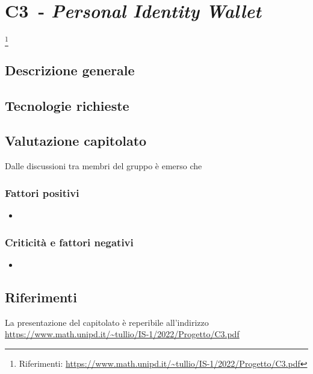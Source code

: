 
\renewcommand{\capName}{\textit{Personal Identity Wallet}} %
\renewcommand{\capCode}{C3} %
\renewcommand{\capLink}{https://www.math.unipd.it/~tullio/IS-1/2022/Progetto/C3.pdf} %
\renewcommand{\capProposer}{InfoCert} %


\section{\capCode\ - \capName} \footnote{Riferimenti: \url{\capLink}}
\subsection{Descrizione generale}

\subsection{Tecnologie richieste}

\subsection{Valutazione capitolato}
Dalle discussioni tra membri del gruppo è emerso che

\subsubsection{Fattori positivi}

\begin{itemize}
    \item 
\end{itemize}

\subsubsection{Criticità e fattori negativi}

\begin{itemize}
    \item 
\end{itemize}

\subsection{Riferimenti}
La presentazione del capitolato è reperibile all'indirizzo \url{\capLink}